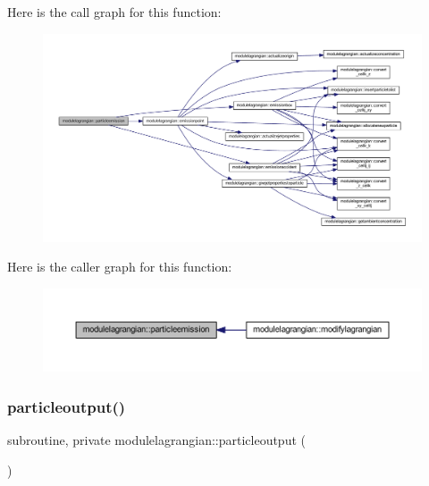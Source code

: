 Here is the call graph for this function\+:\nopagebreak
\begin{figure}[H]
\begin{center}
\leavevmode
\includegraphics[width=350pt]{namespacemodulelagrangian_a529648b66afb4cc44ecf46c2557c0c35_cgraph}
\end{center}
\end{figure}
Here is the caller graph for this function\+:\nopagebreak
\begin{figure}[H]
\begin{center}
\leavevmode
\includegraphics[width=350pt]{namespacemodulelagrangian_a529648b66afb4cc44ecf46c2557c0c35_icgraph}
\end{center}
\end{figure}
\mbox{\label{namespacemodulelagrangian_aa775be66f039a949bf0d897457b63cab}} 
\subsubsection{\texorpdfstring{particleoutput()}{particleoutput()}}
{\footnotesize\ttfamily subroutine, private modulelagrangian\+::particleoutput (\begin{DoxyParamCaption}{ }\end{DoxyParamCaption})\hspace{0.3cm}{\ttfamily [private]}}

